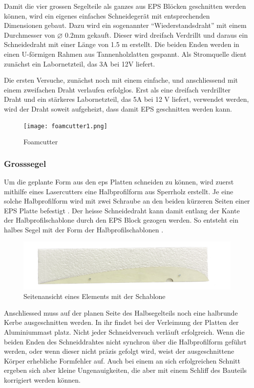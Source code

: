Damit die  vier grossen Segelteile als ganzes aus EPS Blöcken geschnitten werden können, wird ein eigenes einfaches Schneidegerät mit entsprechenden Dimensionen gebaut.  Dazu wird ein sogenannter \enquote{Wiederstandsdraht} mit einem Durchmesser von $\varnothing$ 0.2mm gekauft. Dieser wird dreifach Verdrillt und daraus ein Schneidedraht mit einer Länge von 1.5 m erstellt. Die beiden Enden werden in einen U-förmigen Rahmen aus Tannenholzlatten gespannt. Als Stromquelle dient zunächst ein Labornetzteil, das 3A bei 12V liefert. 

Die ersten Versuche, zunächst noch mit einem einfache, und anschliessend mit einem zweifachen Draht verlaufen erfolglos. Erst als eine dreifach verdrillter Draht und ein stärkeres Labornetzteil, das 5A bei 12 V liefert, verwendet werden, wird der Draht soweit aufgeheizt, dass damit EPS geschnitten werden kann.     


\begin{figure}[H]
    \centering
    \texttt{[image: foamcutter1.png]}
    \caption{Foamcutter}
    \label{fig:enter-label}
\end{figure}

\subsubsection*{Grosssegel}
Um die geplante Form aus den \ac{eps} Platten schneiden zu können, wird zuerst mithilfe eines Lasercutters eine Halbprofilform aus Sperrholz erstellt. Je eine solche Halbprofilform wird mit zwei  Schraube an den beiden kürzeren Seiten einer EPS Platte  befestigt . Der heisse Schneidedraht kann damit entlang der Kante der Halbprofilschablone durch den EPS Block gezogen werden. So entsteht ein halbes Segel mit der Form der Halbprofilschablonen . \\


\begin{figure}[H]
    \centering
    \includegraphics[width=1\linewidth]{assets/template_on_foam.png}
    \caption{Seitenansicht eines Elements mit der Schablone}
    \label{fig:enter-label}
\end{figure}

Anschliessed muss auf der planen Seite des Halbsegelteils noch eine halbrunde Kerbe ausgeschnitten werden. In ihr findet bei der Verleimung der Platten der Aluminiummast platz. Nicht jeder Schneidversuch verläuft erfolgreich. Wenn die beiden Enden des Schneiddrahtes nicht synchron über die Halbprofilform geführt werden, oder wenn dieser nicht präzis gefolgt wird, weist der ausgeschnittene Körper erhebliche Formfehler auf. Auch bei einem an sich erfolgreichen Schnitt ergeben sich aber kleine Ungenauigkeiten, die aber mit einem Schliff des Bauteils korrigiert werden können. 

